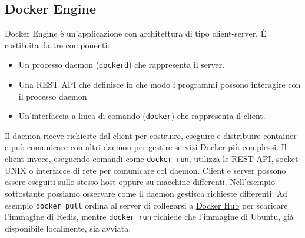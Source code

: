\subsection{Docker Engine}
Docker Engine è un'applicazione con architettura di tipo client-server. È costituita da tre componenti:
\begin{itemize}
    \item Un processo daemon (\verb|dockerd|) che rappresenta il server.
    \item Una REST API che definisce in che modo i programmi possono interagire con il processo daemon.
    \item Un'interfaccia a linea di comando (\verb|docker|) che rappresenta il client.
\end{itemize}
Il daemon riceve richieste dal client per costruire, eseguire e distribuire container e può comunicare con altri daemon per gestire servizi Docker più complessi. Il client invece, eseguendo comandi come \verb|docker run|, utilizza le REST API, socket UNIX o interfacce di rete per comunicare col daemon. Client e server possono essere eseguiti sullo stesso host oppure su macchine differenti. Nell'\hyperref[fig:docker_engine_b]{esempio} sottostante possiamo osservare come il daemon gestisca richieste differenti. Ad esempio \verb|docker pull| ordina al server di collegarsi a \hyperref[docker-hub]{Docker Hub} per scaricare l'immagine di Redis, mentre \verb|docker run| richiede che l'immagine di Ubuntu, già disponibile localmente, sia avviata.
